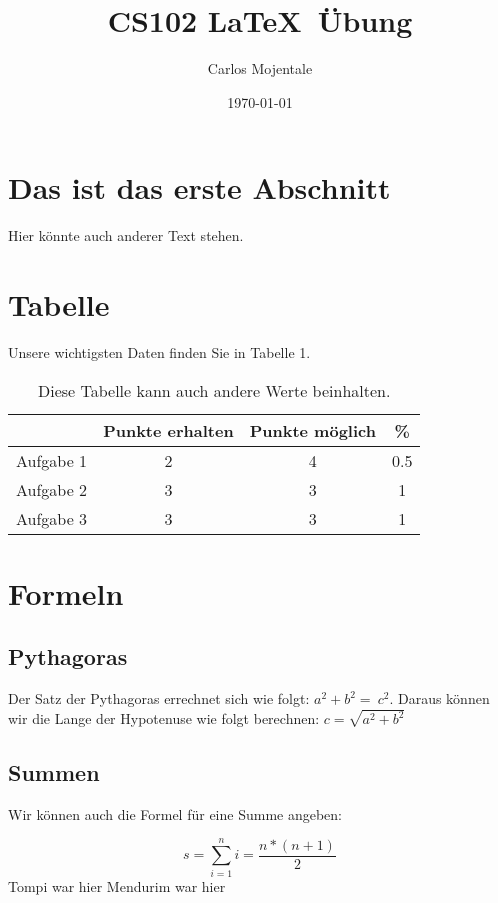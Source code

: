 \documentclass[10pt]{article}
\title{CS102 \LaTeX ~\"Ubung}
\author{Carlos Mojentale}
\date{\today}
\begin{document}
\maketitle

\section{Das ist das erste Abschnitt}

Hier k\"onnte auch anderer Text stehen.

\section{Tabelle}

Unsere wichtigsten Daten finden Sie in Tabelle 1.

\begin{table}[!th]

\centering

\begin{tabular}{c|c|c|c}

& Punkte erhalten & Punkte m\"oglich & \% \\

\hline

Aufgabe 1 & 2 & 4 & 0.5 \\

Aufgabe 2 & 3 & 3 & 1 \\

Aufgabe 3 & 3 & 3 & 1 \\

\end{tabular}

\caption{Diese Tabelle kann auch andere Werte beinhalten.}

\label{table:diese Tabelle kann auch andere Werte beinhalten.}

\end{table}

\section{Formeln}

\subsection{Pythagoras}

Der Satz der Pythagoras errechnet sich wie folgt: $a^{2} + b^{2} =\ c^{2}$. Daraus k\"onnen 
\\wir die Lange der Hypotenuse wie folgt berechnen: $c =\sqrt{a^{2} + b^{2}}$ 

\subsection{Summen}

Wir k\"onnen auch die Formel f\"ur eine Summe angeben:

\begin{equation}
s = \sum_{i=1}^n i = \frac{n*(n+1)}{2}
\end{equation}
Tompi war hier
Mendurim war hier 
\end{document}
